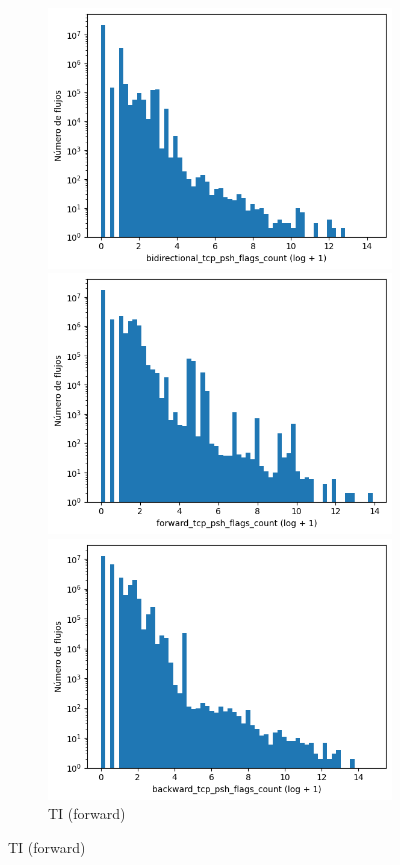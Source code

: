 \begin{figure}[H]
\begin{subfigure}[b]{0.26\textwidth}
        \includegraphics[width=\linewidth]{media/packet_pincer_toniot/bidirectional_tcp_psh_flags_count_log_x_log_y.png}
        \caption{TI (bidir.)}
        \includegraphics[width=\linewidth]{media/packet_pincer_toniot/forward_tcp_psh_flags_count_log_x_log_y.png}
        \caption{TI (forward)}
        \includegraphics[width=\linewidth]{media/packet_pincer_toniot/backward_tcp_psh_flags_count_log_x_log_y.png}

\end{subfigure}
\end{figure}
